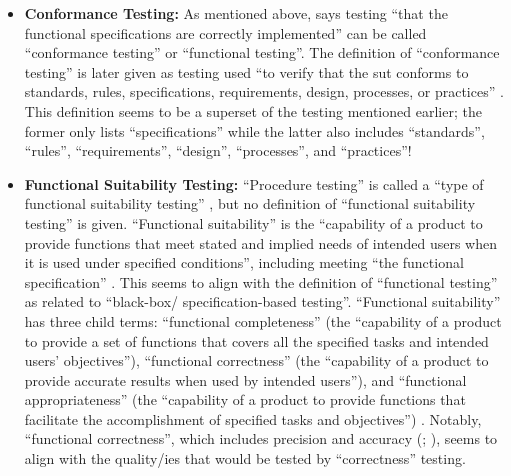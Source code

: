 \begin{itemize}
      \item \textbf{Conformance Testing:} As mentioned above,
            \citet[p.~5-7]{SWEBOK2024} says testing ``that the functional
            specifications are correctly implemented'' can be called
            ``conformance testing'' or ``functional testing''. The definition
            of ``conformance testing'' is later given as testing used ``to
            verify that the \acs{sut} conforms to standards, rules,
            specifications, requirements, design, processes, or practices''
            \citep[p.~5-7]{SWEBOK2024}. This definition seems to be a superset
            of the testing mentioned earlier; the former only lists
            ``specifications'' while the latter also includes ``standards'',
            ``rules'', ``requirements'', ``design'', ``processes'', and
            ``practices''!

      \item \textbf{Functional Suitability Testing:} ``Procedure testing'' is
            called a ``type of functional suitability testing''
            \citep[p.~7]{IEEE2022}, but no definition of ``functional
            suitability testing'' is given. ``Functional suitability'' is the
            ``capability of a product to provide functions that meet stated and
            implied needs of intended users when it is used under specified
            conditions'', including meeting ``the functional specification''
            \citep{ISO_IEC2023a}. This seems to align with the definition of
            ``functional testing'' as related to ``black-box/
            specification-based testing''. ``Functional suitability'' has
            three child terms: ``functional completeness'' (the ``capability of
            a product to provide a set of functions that covers all the
            specified tasks and intended users' objectives''), ``functional
            correctness'' (the ``capability of a product to provide accurate
            results when used by intended users''), and ``functional
            appropriateness'' (the ``capability of a product to provide
            functions that facilitate the accomplishment of specified tasks and
            objectives'') \citep{ISO_IEC2023a}. Notably, ``functional
            correctness'', which includes precision and accuracy
            (\citealp{ISO_IEC2023a}; ), seems to align with
            the quality/ies that would be tested by ``correctness'' testing.
\end{itemize}

